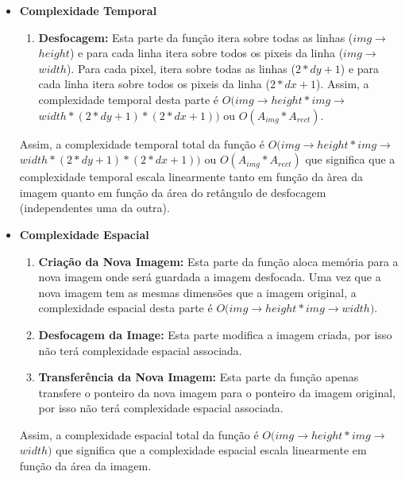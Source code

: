 \begin{itemize}

\item
\textbf{Complexidade Temporal}

\begin{enumerate}
    \item \textbf{Desfocagem:} Esta parte da função itera sobre todas as linhas ($img$$\rightarrow$$height$) e para cada linha itera sobre todos os pixeis da linha ($img$$\rightarrow$$width$). Para cada pixel, itera sobre todas as linhas ($2 * dy + 1$) e para cada linha itera sobre todos os pixeis da linha ($2 * dx + 1$). Assim, a complexidade temporal desta parte é $O(img$$\rightarrow$$height * img$$\rightarrow$$width * (2 * dy + 1) * (2 * dx + 1))$ ou $O(A_{img}*A_{rect})$.
\end{enumerate}

Assim, a complexidade temporal total da função é $O(img$$\rightarrow$$height * img$$\rightarrow$$width * (2 * dy + 1) * (2 * dx + 1))$ ou $O(A_{img}*A_{rect})$ que significa que a complexidade temporal escala linearmente tanto em função da àrea da imagem quanto em função da área do retângulo de desfocagem (independentes uma da outra).

\item

\textbf{Complexidade Espacial}

\begin{enumerate}
    \item \textbf{Criação da Nova Imagem:} Esta parte da função aloca memória para a nova imagem onde será guardada a imagem desfocada. Uma vez que a nova imagem tem as mesmas dimensões que a imagem original, a complexidade espacial desta parte é $O(img$$\rightarrow$$height * img$$\rightarrow$$width)$.
    \item \textbf{Desfocagem da Image:} Esta parte modifica a imagem criada, por isso não terá complexidade espacial associada.
    \item \textbf{Transferência da Nova Imagem:} Esta parte da função apenas transfere o ponteiro da nova imagem para o ponteiro da imagem original, por isso não terá complexidade espacial associada.
\end{enumerate}

Assim, a complexidade espacial total da função é $O(img$$\rightarrow$$height * img$$\rightarrow$$width)$ que significa que a complexidade espacial escala linearmente em função da área da imagem.

\end{itemize}

